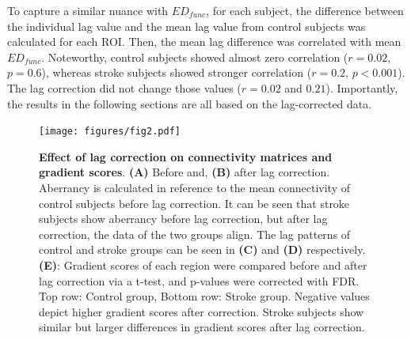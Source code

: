 \documentclass[fleqn,10pt]{wlscirep}
\begin{document}
To capture a similar nuance with $\textit{ED}_{{func}}$, for each subject, the difference between the individual lag value and the mean lag value from control subjects was calculated for each ROI. Then, the mean lag difference was correlated with mean $\textit{ED}_{{func}}$. Noteworthy, control subjects showed almost zero correlation ($r = 0.02$, $ p = 0.6$), whereas stroke subjects showed stronger correlation ($r = 0.2$, $p < 0.001$). The lag correction did not change those values ($r = 0.02$ and $0.21$). Importantly, the results in the following sections are all based on the lag-corrected data.

\begin{figure}[]
\centering
\texttt{[image: figures/fig2.pdf]}
\caption{\label{fig:lag_abr} \textbf{Effect of lag correction on connectivity matrices and gradient scores}.  \textbf{(A)} Before and, \textbf{(B)} after lag correction.
Aberrancy is calculated in reference to the mean connectivity of control subjects before lag correction. It can be seen that
stroke subjects show aberrancy before lag correction, but after lag correction, the data of the two groups align. The lag patterns
of control and stroke groups can be seen in \textbf{(C)} and \textbf{(D)} respectively. \textbf{(E)}:  Gradient scores of each region were compared before and after lag correction via a t-test, and p-values were corrected with FDR. Top row: Control group, Bottom row: Stroke group. Negative values depict higher gradient scores after correction. Stroke subjects show similar but larger differences in gradient scores after lag correction.}
\end{figure}
\end{document}
